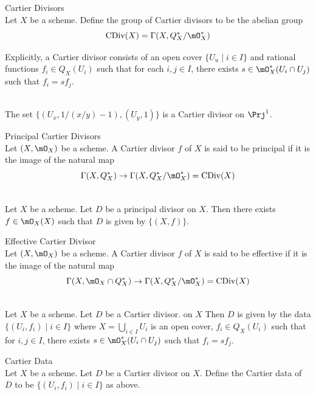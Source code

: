 \documentclass[a4paper]{article}
\begin{document}
\begin{defn}{Cartier Divisors}{}\\
Let $X$ be a scheme. Define the group of Cartier divisors to be the abelian group $$\text{CDiv}(X)=\Gamma(X,Q_X^\ast/\mO_X^\ast)$$
\end{defn}

Explicitly, a Cartier divisor consists of an open cover $\{U_u\;|\;i\in I\}$ and rational functions $f_i\in Q_X(U_i)$ such that for each $i,j\in I$, there exists $s\in\mO_X^\ast(U_i\cap U_j)$ such that $f_i=sf_j$. 

\begin{eg}{}{}\\
The set $\{(U_x,1/(x/y)-1),(U_y,1)\}$ is a Cartier divisor on $\Prj^1$. 
\end{eg}

\begin{defn}{Principal Cartier Divisors}{}\\
Let $(X,\mO_X)$ be a scheme. A Cartier divisor $f$ of $X$ is said to be principal if it is the image of the natural map $$\Gamma(X,Q_X^\ast)\to\Gamma(X,Q_X^\ast/\mO_X^\ast)=\text{CDiv}(X)$$
\end{defn}

\begin{lmm}{}{}\\
Let $X$ be a scheme. Let $D$ be a principal divisor on $X$. Then there exists $f\in\mO_X(X)$ such that $D$ is given by $\{(X,f)\}$. 
\end{lmm}

\begin{defn}{Effective Cartier Divisor}{}\\
Let $(X,\mO_X)$ be a scheme. A Cartier divisor $f$ of $X$ is said to be effective if it is the image of the natural map $$\Gamma(X,\mO_X\cap Q_X^\ast)\to\Gamma(X,Q_X^\ast/\mO_X^\ast)=\text{CDiv}(X)$$
\end{defn}

\begin{lmm}{}{}\\
Let $X$ be a scheme. Let $D$ be a Cartier divisor. on $X$ Then $D$ is given by the data $\{(U_i,f_i)\;|\;i\in I\}$ where $X=\bigcup_{i\in I}U_i$ is an open cover, $f_i\in Q_X(U_i)$ such that for $i,j\in I$, there exists $s\in\mO_X^\ast(U_i\cap U_j)$ such that $f_i=sf_j$. 
\end{lmm}

\begin{defn}{Cartier Data}{}\\
Let $X$ be a scheme. Let $D$ be a Cartier divisor on $X$. Define the Cartier data of $D$ to be $\{(U_i,f_i)\;|\;i\in I\}$ as above. 
\end{defn}
\end{document}
